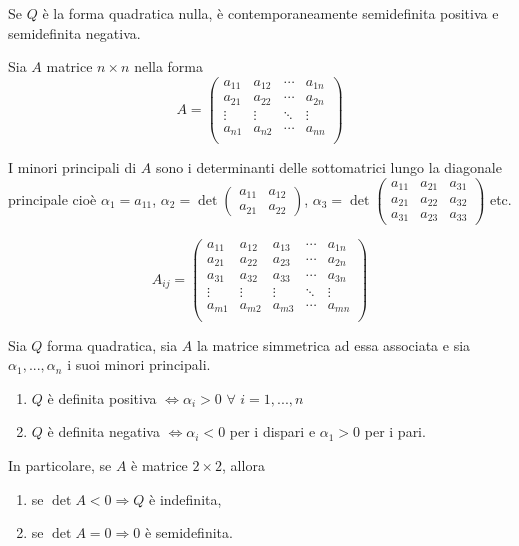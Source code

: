 \begin{attbar}
	Se $Q$ è la forma quadratica nulla, è contemporaneamente semidefinita positiva e semidefinita negativa.
\end{attbar}

Sia $A$ matrice $n \times n$ nella forma
\begin{equation*}
	A= 
	\begin{pmatrix}
		a_{11}&a_{12} &\cdots &a_{1n} \\
		a_{21}&a_{22} &\cdots &a_{2n} \\
		\vdots&\vdots &\ddots &\vdots \\
		a_{n1}&a_{n2} &\cdots &a_{nn} \\
	\end{pmatrix}
\end{equation*}

I minori principali di $A$ sono i determinanti delle sottomatrici lungo la diagonale principale cioè $\alpha_1=a_{11}$, $\alpha_2=\det\begin{pmatrix}
	a_{11}&a_{12} \\
	a_{21}&a_{22}
\end{pmatrix}$, $\alpha_3=\det\begin{pmatrix}
	a_{11}&a_{21}&a_{31} \\
	a_{21}&a_{22}&a_{32} \\
	a_{31}&a_{23}&a_{33} 
\end{pmatrix}$
etc.

$$
A_{ij} = \begin{pmatrix}
	a_{11} & a_{12} & a_{13} & \cdots & a_{1n} \\
	a_{21} & a_{22} & a_{23} & \cdots & a_{2n} \\
	a_{31} & a_{32} & a_{33} & \cdots & a_{3n} \\
	\vdots & \vdots & \vdots & \ddots & \vdots \\
	a_{m1} & a_{m2} & a_{m3} & \cdots & a_{mn} \\
\end{pmatrix}
$$ 



\begin{proposition}
	Sia $Q$ forma quadratica, sia $A$ la matrice simmetrica ad essa associata e sia $\alpha_1,...,\alpha_n$ i suoi minori principali.
	\begin{enumerate}
		\item $Q$ è definita positiva $\Leftrightarrow \alpha_i >0\,\, \forall \,\, i =1,...,n$
		\item $Q$ è definita negativa $\Leftrightarrow \alpha_i <0 $ per i dispari e $\alpha_1>0$ per i pari. 
	\end{enumerate}
	
	In particolare, se $A$ è matrice $2 \times 2$, allora
	\begin{enumerate}
		\item se $\det A <0 \Rightarrow Q$ è indefinita,
		\item se $\det A=0 \Rightarrow 0$ è semidefinita.
	\end{enumerate}
\end{proposition}



